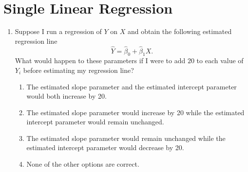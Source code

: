 \documentclass[10pt]{article}
\begin{document}
\section{Single Linear Regression}%
\label{sec:regression}

\begin{enumerate}
	\item Suppose I run a regression of \(Y\) on  \(X\) and obtain the following estimated regression line
	\[
	    \widehat Y = \hat\beta_0 + \hat\beta_1 X
	.\] 
	What would happen to these parameters if I were to add \(20\) to each value of  \(Y_i\) before estimating my regression line?
	\begin{enumerate}
		\item The estimated slope parameter and the estimated intercept parameter would both increase by 20. 
		\item The estimated slope parameter would increase by 20 while the estimated intercept parameter would remain unchanged.
		\item The estimated slope parameter would remain unchanged while the estimated intercept parameter would decrease by 20. 
		\item None of the other options are correct. 
	\end{enumerate}


\end{enumerate}
\end{document}
